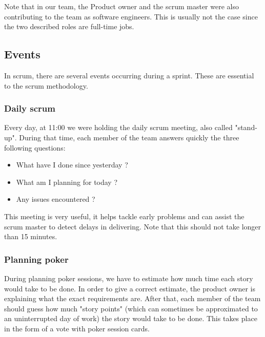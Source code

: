 Note that in our team, the Product owner and the \gls{scrum} master were also contributing to the team as software engineers.
This is usually not the case since the two described roles are full-time jobs.

\subsection{Events}
In \gls{scrum}, there are several events occurring during a sprint.
These are essential to the \gls{scrum} methodology.

\subsubsection{Daily scrum}\label{sec:daily}
Every day, at 11:00 we were holding the daily \gls{scrum} meeting, also called "stand-up".
During that time, each member of the team answers quickly the three following questions:

\begin{itemize}
    \item What have I done since yesterday ?
    \item What am I planning for today ?
    \item Any issues encountered ?
\end{itemize}

This meeting is very useful, it helps tackle early problems and can assist the \gls{scrum} master to detect delays in delivering.
Note that this should not take longer than 15 minutes.


\subsubsection{Planning poker}
During planning poker sessions, we have to estimate how much time each story
would take to be done. In order to give a correct estimate, the product owner is
explaining what the exact requirements are. After that, each member of the team
should guess how much "story points" (which can sometimes be approximated to an
uninterrupted day of work) the story would take to be done. This takes place in the
form of a vote with poker session cards.


